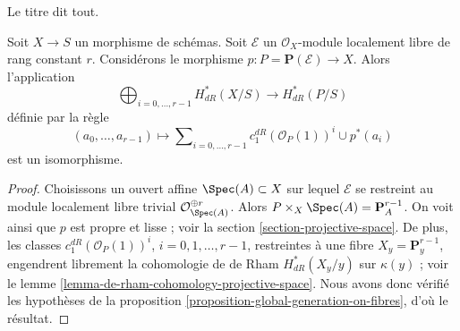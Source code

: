 \noindent
Le titre dit tout.

\begin{proposition}
\label{proposition-projective-space-bundle-formula}
Soit $X \to S$ un morphisme de schémas. Soit $\mathcal{E}$ un
$\mathcal{O}_X$-module localement libre de rang constant $r$. Considérons le morphisme
$p : P = \mathbf{P}(\mathcal{E}) \to X$.
Alors l'application
$$
\bigoplus\nolimits_{i = 0, \ldots, r - 1} H^*_{dR}(X/S)
\longrightarrow
H^*_{dR}(P/S)
$$
définie par la règle
$$
(a_0, \ldots, a_{r - 1}) \longmapsto
\sum\nolimits_{i = 0, \ldots, r - 1} c_1^{dR}(\mathcal{O}_P(1))^i \cup p^*(a_i)
$$
est un isomorphisme.
\end{proposition}

\begin{proof}
Choisissons un ouvert affine $\Spec(A) \subset X$ sur lequel $\mathcal{E}$ se restreint
au module localement libre trivial $\mathcal{O}_{\Spec(A)}^{\oplus r}$.
Alors $P \times_X \Spec(A) = \mathbf{P}^{r - 1}_A$. On voit ainsi que
$p$ est propre et lisse ; voir la section \ref{section-projective-space}.
De plus, les classes $c_1^{dR}(\mathcal{O}_P(1))^i$, $i = 0, 1, \ldots, r - 1$,
restreintes à une fibre $X_y = \mathbf{P}^{r - 1}_y$, engendrent librement la
cohomologie de de Rham $H^*_{dR}(X_y/y)$ sur $\kappa(y)$ ; voir
le lemme \ref{lemma-de-rham-cohomology-projective-space}. Nous avons donc vérifié les
hypothèses de la proposition \ref{proposition-global-generation-on-fibres},
d'où le résultat.
\end{proof}

